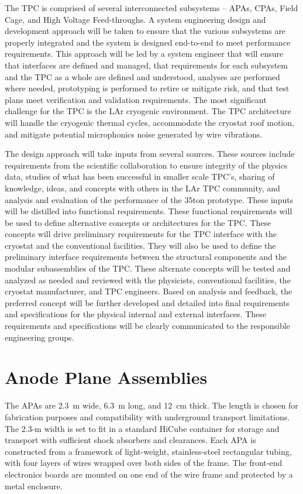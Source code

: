 The TPC is comprised of several interconnected subsystems – APAs, CPAs, Field Cage, and High Voltage Feed-throughs. A system engineering design and development approach will be taken to ensure that the various subsystems are properly integrated and the system is designed end-to-end to meet performance requirements. This approach will be led by a system engineer that will ensure that interfaces are defined and managed, that requirements for each subsystem and the TPC as a whole are defined and understood, analyses are performed where needed, prototyping is performed to retire or mitigate risk, and that test plans meet verification and validation requirements. The most significant challenge for the TPC is the LAr cryogenic environment. The TPC architecture will handle the cryogenic thermal cycles, accommodate the cryostat roof motion, and mitigate potential microphonics noise generated by wire vibrations.

The design approach will take inputs from several sources.  These sources include requirements from the scientific collaboration to ensure integrity of the physics data, studies of what has been successful in smaller scale TPC's, sharing of knowledge, ideas, and concepts with others in the LAr TPC community, and analysis and evaluation of the performance of the 35ton prototype.  These inputs will be distilled into functional requirements.  These functional requirements will be used to define alternative concepts or architectures for the TPC.  These concepts will drive preliminary requirements for the TPC interface with the cryostat and the conventional facilities.  They will also be used to define the preliminary interface requirements between the structural components and the modular subassemblies of the TPC.  These alternate concepts will be tested and analyzed as needed and reviewed with the physicists, conventional facilities, the cryostat manufacturer, and TPC engineers.  Based on analysis and feedback, the preferred concept will be further developed and detailed into final requirements and specifications for the physical internal and external interfaces.  These requirements and specifications will be clearly communicated to the responsible engineering groups.


\section{Anode Plane Assemblies}
\label{subsec:v5-tpc-chamber-apa}

The APAs are 2.3~m wide, 6.3~m long, and 12~cm thick. The length is chosen for fabrication purposes and compatibility with underground transport limitations. The 2.3-m width is set to fit in a standard HiCube container for storage and transport with sufficient shock absorbers and clearances. 
Each APA is constructed from a framework of light-weight, stainless-steel rectangular tubing, with four layers of wires wrapped over both sides of the frame. The front-end electronics boards are mounted on one end of the wire frame and protected by a metal enclosure.  

